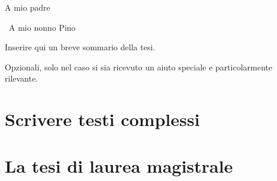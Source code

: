 \documentclass[pdfa%
,cucitura%
]{toptesi}
\begin{document}

%



\frontespizio
\paginavuota
\newpage
\advance\voffset -5mm
\advance\textheight 30mm

\begin{dedica}
A mio padre

\textdagger\ A mio nonno Pino
\end{dedica}

\sommario

Inserire qui un breve sommario della tesi.

\ringraziamenti

Opzionali, solo nel caso si sia ricevuto un aiuto speciale e particolarmente rilevante.



\indici

\mainmatter

\chapter{Scrivere testi complessi}



\chapter{La tesi di laurea magistrale}
\end{document}
